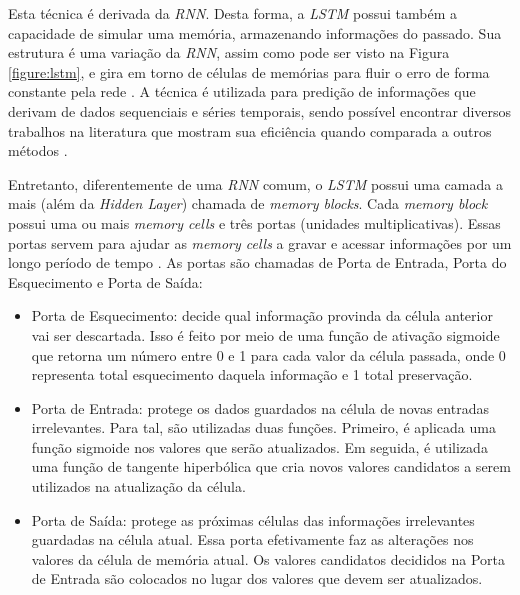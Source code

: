 
Esta técnica é derivada da \textit{\acrshort{RNN}}. Desta forma, a \textit{\acrshort{LSTM}} possui também a capacidade de simular uma memória, armazenando informações do passado. Sua estrutura é uma variação da \textit{\acrshort{RNN}}, assim como pode ser visto na Figura \ref{figure:lstm}, e gira em torno de células de memórias para fluir o erro de forma constante pela rede \cite{doi:10.1162/neco.1997.9.8.1735}. A técnica é utilizada para predição de informações que derivam de dados sequenciais e séries temporais, sendo possível encontrar diversos trabalhos na literatura que mostram sua eficiência quando comparada a outros métodos \cite{alex2012}.

Entretanto, diferentemente de uma \textit{\acrshort{RNN}} comum, o \textit{\acrshort{LSTM}} possui uma camada a mais (além da \textit{Hidden Layer}) chamada de \textit{memory blocks}. Cada \textit{memory block} possui uma ou mais \textit{memory cells} e três portas (unidades multiplicativas). Essas portas servem para ajudar as \textit{memory cells} a gravar e acessar informações por um longo período de tempo \cite{alex2012}. As portas são chamadas de Porta de Entrada, Porta do Esquecimento e Porta de Saída:

\begin{itemize}
 \item Porta de Esquecimento: decide qual informação provinda da célula anterior vai ser descartada. Isso é feito por meio de uma função de ativação sigmoide que retorna um número entre 0 e 1 para cada valor da célula passada, onde 0 representa total esquecimento daquela informação e 1 total preservação.
 
 \item Porta de Entrada: protege os dados guardados na célula de novas entradas irrelevantes. Para tal, são utilizadas duas funções. Primeiro, é aplicada uma função sigmoide nos valores que serão atualizados. Em seguida, é utilizada uma função de tangente hiperbólica que cria novos valores candidatos a serem utilizados na atualização da célula.
 
 \item Porta de Saída: protege as próximas células das informações irrelevantes guardadas na célula atual. Essa porta efetivamente faz as alterações nos valores da célula de memória atual. Os valores candidatos decididos na Porta de Entrada são colocados no lugar dos valores que devem ser atualizados.
\end{itemize}

